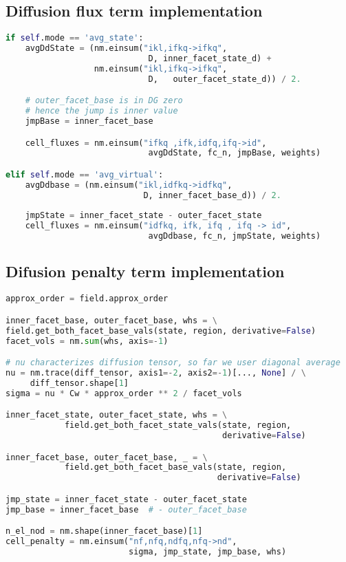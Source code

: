 \subsection{Diffusion flux term implementation}
\label{se:diff_flux_term_imp}
\setcounter{lstannotation}{0}
\begin{lstlisting}[language=Python, caption=Computation of diffusion cell 
fluxes]
if self.mode == 'avg_state':
	avgDdState = (nm.einsum("ikl,ifkq->ifkq",
							 D, inner_facet_state_d) +
				  nm.einsum("ikl,ifkq->ifkq",
		     				 D,   outer_facet_state_d)) / 2.

	# outer_facet_base is in DG zero 
	# hence the jump is inner value
	jmpBase = inner_facet_base

	cell_fluxes = nm.einsum("ifkq ,ifk,idfq,ifq->id",
						 	 avgDdState, fc_n, jmpBase, weights)

elif self.mode == 'avg_virtual':
	avgDdbase = (nm.einsum("ikl,idfkq->idfkq",
							D, inner_facet_base_d)) / 2.
	
	jmpState = inner_facet_state - outer_facet_state
	cell_fluxes = nm.einsum("idfkq, ifk, ifq , ifq -> id",
							 avgDdbase, fc_n, jmpState, weights)

\end{lstlisting}


\subsection{Difusion penalty term implementation}
\label{se:diff_penal_term_imp}
\setcounter{lstannotation}{0}
\begin{lstlisting}[language=Python, caption=Computation of penalty cell 
fluxes]
approx_order = field.approx_order

inner_facet_base, outer_facet_base, whs = \
field.get_both_facet_base_vals(state, region, derivative=False)
facet_vols = nm.sum(whs, axis=-1)

# nu characterizes diffusion tensor, so far we user diagonal average
nu = nm.trace(diff_tensor, axis1=-2, axis2=-1)[..., None] / \
     diff_tensor.shape[1]
sigma = nu * Cw * approx_order ** 2 / facet_vols

inner_facet_state, outer_facet_state, whs = \
			field.get_both_facet_state_vals(state, region, 
			                                derivative=False)

inner_facet_base, outer_facet_base, _ = \
			field.get_both_facet_base_vals(state, region, 
			                               derivative=False)

jmp_state = inner_facet_state - outer_facet_state
jmp_base = inner_facet_base  # - outer_facet_base

n_el_nod = nm.shape(inner_facet_base)[1]
cell_penalty = nm.einsum("nf,nfq,ndfq,nfq->nd",
                         sigma, jmp_state, jmp_base, whs)

\end{lstlisting}




